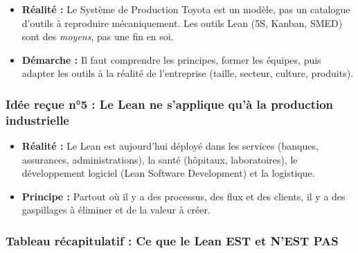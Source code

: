 \documentclass[a4paper,12pt]{article}
\begin{document}
\begin{center}
\end{center}

\begin{itemize}
    \item \textbf{Réalité :} Le Système de Production Toyota est un modèle, pas un catalogue d'outils à reproduire mécaniquement. Les outils Lean (5S, Kanban, SMED) sont des \textit{moyens}, pas une fin en soi.
    \item \textbf{Démarche :} Il faut comprendre les principes, former les équipes, puis adapter les outils à la réalité de l'entreprise (taille, secteur, culture, produits).
\end{itemize}

\subsubsection{Idée reçue n°5 : Le Lean ne s'applique qu'à la production industrielle}

\begin{center}
\end{center}

\begin{itemize}
    \item \textbf{Réalité :} Le Lean est aujourd'hui déployé dans les services (banques, assurances, administrations), la santé (hôpitaux, laboratoires), le développement logiciel (Lean Software Development) et la logistique.
    \item \textbf{Principe :} Partout où il y a des processus, des flux et des clients, il y a des gaspillages à éliminer et de la valeur à créer.
\end{itemize}

\subsubsection{Tableau récapitulatif : Ce que le Lean EST et N'EST PAS}
\end{document}
